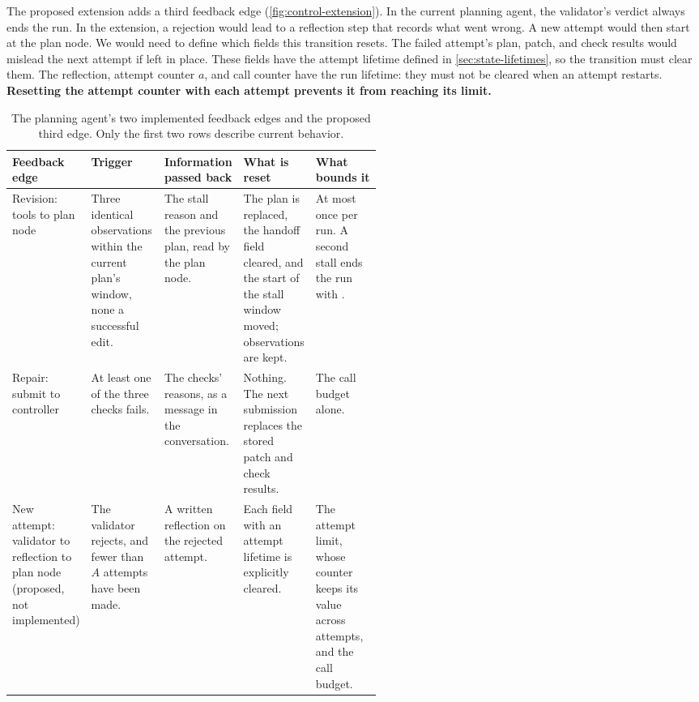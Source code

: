 The proposed extension adds a third feedback edge (\cref{fig:control-extension}). In the current
planning agent, the validator's verdict always ends the run. In the extension, a rejection would
lead to a reflection step that records what went wrong. A new attempt would then start at the
plan node. We would need to define which fields this transition resets. The failed attempt's
plan, patch, and check results would mislead the next attempt if left in place. These fields have
the attempt lifetime defined in \cref{sec:state-lifetimes}, so the transition must clear them.
The reflection, attempt counter $a$, and call counter have the run lifetime: they must not be
cleared when an attempt restarts. \textbf{Resetting the attempt counter with each attempt prevents it from
reaching its limit.}

\begin{table}[tbp]
  \centering
  \begin{adjustbox}{width=\linewidth}\begin{tabularx}{\linewidth}{@{}L{0.14\linewidth}L{0.2\linewidth}XXL{0.19\linewidth}@{}}
    \toprule
    \textbf{Feedback edge} & \textbf{Trigger} & \textbf{Information passed back} & \textbf{What is reset}
      & \textbf{What bounds it} \\
    \midrule
    Revision: tools to plan node & Three identical observations within the current plan's window, none a
      successful edit. & The stall reason and the previous plan, read by the plan node. & The plan is
      replaced, the handoff field cleared, and the start of the stall window moved; observations are kept. & At
      most once per run. A second stall ends the run with . \\
    Repair: submit to controller & At least one of the three checks fails. & The checks' reasons, as
      a message in the conversation. & Nothing. The next submission replaces the stored patch and
      check results. & The call budget alone. \\
    New attempt: validator to reflection to plan node (proposed, not implemented) & The validator
      rejects, and fewer than $A$ attempts have been made. & A written reflection on the rejected
      attempt. & Each field with an attempt lifetime is explicitly cleared. & The attempt limit,
      whose counter keeps its value across attempts, and the call budget. \\
    \bottomrule
  \end{tabularx}\end{adjustbox}
  \caption{The planning agent's two implemented feedback edges and the proposed third edge. Only the
  first two rows describe current behavior.}
  \label{tab:control-backedges}
\end{table}

